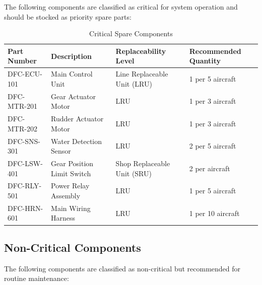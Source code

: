 \documentclass[12pt,a4paper,twoside,openright]{book}
\newcommand{\tabletextfont}{\normalfont\rmfamily}
\newcommand{\tableheadfont}{\normalfont\bfseries}
\begin{document}
The following components are classified as critical for system operation and should be stocked as priority spare parts:

\begin{table}[h]
\centering
\setlength{\tabcolsep}{5pt} %
\begin{tabular}{|p{}|p{}|p{}|p{}|}
\hline
\tableheadfont\textbf{Part Number} & \tableheadfont\textbf{Description} & \tableheadfont\textbf{Replaceability Level} & \tableheadfont\textbf{Recommended Quantity} \\
\hline
\tabletextfont DFC-ECU-101 & Main Control Unit & Line Replaceable Unit (LRU) & 1 per 5 aircraft \\
\hline
\tabletextfont DFC-MTR-201 & Gear Actuator Motor & LRU & 1 per 3 aircraft \\
\hline
\tabletextfont DFC-MTR-202 & Rudder Actuator Motor & LRU & 1 per 3 aircraft \\
\hline
\tabletextfont DFC-SNS-301 & Water Detection Sensor & LRU & 2 per 5 aircraft \\
\hline
\tabletextfont DFC-LSW-401 & Gear Position Limit Switch & Shop Replaceable Unit (SRU) & 2 per aircraft \\
\hline
\tabletextfont DFC-RLY-501 & Power Relay Assembly & LRU & 1 per 5 aircraft \\
\hline
\tabletextfont DFC-HRN-601 & Main Wiring Harness & LRU & 1 per 10 aircraft \\
\hline
\end{tabular}
\caption{Critical Spare Components}
\end{table}

\subsection{Non-Critical Components}

The following components are classified as non-critical but recommended for routine maintenance:
\end{document}
